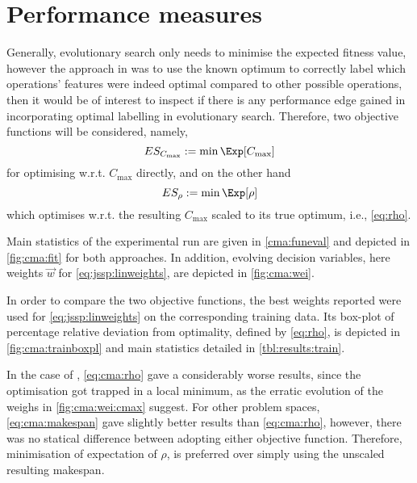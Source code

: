 \section{Performance measures}\label{sec:es:measure}
Generally, evolutionary search only needs to minimise the expected fitness value, however the  approach in \cite{InRu11a} was to use the known optimum to correctly label which operations' features were indeed optimal compared to other possible operations, then it would be of interest to inspect if there is any performance edge gained in incorporating optimal labelling in evolutionary search. Therefore, two objective functions will be considered, namely, 
\begin{equation}
ES_{C_{\max}} := \min \Exp[C_{\max}] \label{eq:cma:makespan}
\end{equation}
for optimising w.r.t. $C_{\max}$ directly, and on the other hand
\begin{equation}
ES_{\rho} := \min \Exp[\rho] \label{eq:cma:rho}
\end{equation} 
which optimises w.r.t. the resulting $C_{\max}$ scaled to its true optimum, i.e., \cref{eq:rho}.

Main statistics of the experimental run are given in \cref{cma:funeval} and depicted in \cref{fig:cma:fit} for both approaches. In addition, evolving decision variables, here weights $\vec{w}$ for \cref{eq:jssp:linweights}, are depicted in \cref{fig:cma:wei}. 

In order to compare the two objective functions, the best weights reported were used for \cref{eq:jssp:linweights} on the corresponding training data. Its box-plot of percentage relative deviation from optimality, defined by \cref{eq:rho}, is depicted in \cref{fig:cma:trainboxpl} and main statistics detailed in \cref{tbl:results:train}. 

In the case of , \cref{eq:cma:rho}  gave a considerably worse results, since the optimisation got trapped in a local minimum, as the erratic evolution of the weighs in \cref{fig:cma:wei:cmax} suggest.
For other problem spaces, \cref{eq:cma:makespan} gave slightly better results than \cref{eq:cma:rho}, however, there was no statical difference between adopting either objective function. Therefore, minimisation of expectation of $\rho$, is preferred over simply using the unscaled resulting makespan. 


